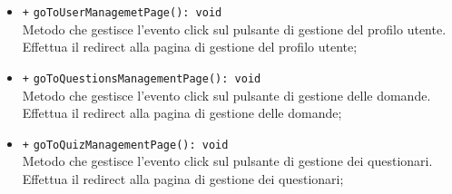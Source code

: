 \begin{itemize}
\begin{itemize}
		\item \texttt{+} \texttt{goToUserManagemetPage(): void} \\
		Metodo che gestisce l’evento click sul pulsante di gestione del profilo utente. Effettua il redirect alla pagina di gestione del profilo utente; 
		\item \texttt{+} \texttt{goToQuestionsManagementPage(): void} \\
		Metodo che gestisce l’evento click sul pulsante di gestione delle domande. Effettua il redirect alla pagina di gestione delle domande; 
		\item \texttt{+} \texttt{goToQuizManagementPage(): void} \\
		Metodo che gestisce l’evento click sul pulsante di gestione dei questionari. Effettua il redirect alla pagina di gestione dei questionari; 
	\end{itemize}
\end{itemize}

